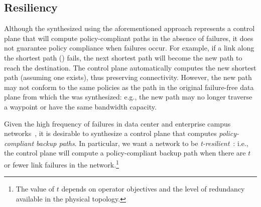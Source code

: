 \subsection{Resiliency}

%

Although the \ARC synthesized using the aforementioned approach represents a
control plane that will compute policy-compliant paths in the absence of
failures, it does not guarantee policy compliance when failures occur. For
example, if a link along the shortest path () fails, the next shortest path will become the new path to reach the
destination. The control plane automatically computes the new shortest path
(assuming one exists), thus preserving connectivity. However, the new path may
not conform to the same policies as the path in the original failure-free data
plane from which the \ARC was synthesized: e.g., the new path may no longer
traverse a waypoint or have the same bandwidth capacity.

Given the high frequency of failures in data center and enterprise campus
networks~\cite{TODO}, it is desirable to synthesize a control plane that
computes {\em policy-compliant backup paths}. In particular, we want a network
to be {\em t-resilient}~\cite{TODO}: i.e., the control plane will compute a
policy-compliant backup path when there are $t$ or fewer link failures in the
network.\footnote{The value of $t$ depends on operator objectives and the
level of redundancy available in the physical topology.}

